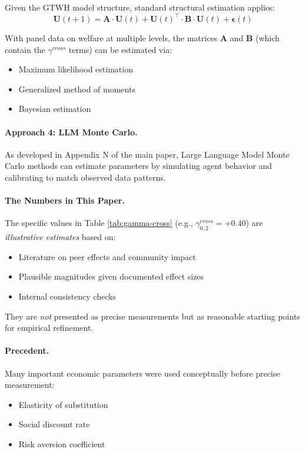 \documentclass[12pt,a4paper]{article}
\begin{document}
Given the GTWH model structure, standard structural estimation applies:
\begin{equation}
\mathbf{U}(t+1) = \mathbf{A} \cdot \mathbf{U}(t) + \mathbf{U}(t)^\top \cdot \mathbf{B} \cdot \mathbf{U}(t) + \boldsymbol{\epsilon}(t)
\end{equation}

With panel data on welfare at multiple levels, the matrices $\mathbf{A}$ and 
$\mathbf{B}$ (which contain the $\gamma^{cross}$ terms) can be estimated via:
\begin{itemize}[nosep]
\item Maximum likelihood estimation
\item Generalized method of moments
\item Bayesian estimation
\end{itemize}

\paragraph{Approach 4: LLM Monte Carlo.}

As developed in Appendix N of the main paper, Large Language Model Monte 
Carlo methods can estimate parameters by simulating agent behavior and 
calibrating to match observed data patterns.

\paragraph{The Numbers in This Paper.}

The specific values in Table \ref{tab:gamma-cross} (e.g., $\gamma^{cross}_{0,2} = +0.40$) 
are \textit{illustrative estimates} based on:
\begin{itemize}[nosep]
\item Literature on peer effects and community impact
\item Plausible magnitudes given documented effect sizes
\item Internal consistency checks
\end{itemize}

They are \textit{not} presented as precise measurements but as reasonable 
starting points for empirical refinement.

\paragraph{Precedent.}

Many important economic parameters were used conceptually before precise 
measurement:
\begin{itemize}[nosep]
\item Elasticity of substitution
\item Social discount rate
\item Risk aversion coefficient
\end{itemize}
\end{document}
